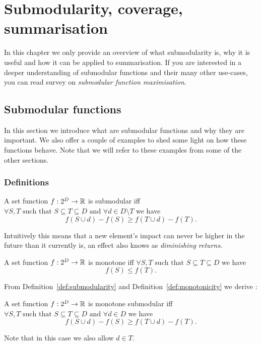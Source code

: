 \chapter{Submodularity, coverage, summarisation}
\label{cap:submodularity}

In this chapter we only provide an overview of what submodularity is, why it is
useful and how it can be applied to summarisation. If you are interested in a
deeper understanding of submodular functions and their many other use-cases,
you can read survey \cite{krause2012submodular} on \emph{submodular function
maximisation}.

\section{Submodular functions}

In this section we introduce what are submodular functions and why they are
important. We also offer a couple of examples to shed some light on how these
functions behave. Note that we will refer to these examples from some of the
other sections.

\subsection{Definitions}

\begin{definition}[Submodularity]
  \label{def:submodularity}
  A set function \(f : 2^D \to \mathbb{R}\) is submodular iff
  \(\forall S, T \text{ such that } S \subseteq T \subseteq D
    \text{ and } \forall d \in D \setminus T\) we have
  \[f(S \cup {d}) - f(S) \geq f(T \cup {d}) - f(T).\]
\end{definition}
Intuitively this means that a new element's impact can never be higher in the
future than it currently is, an effect also knows as \emph{diminishing returns}.

\begin{definition}[Monotonicity]
  \label{def:monotonicity}
  A set function \(f : 2^D \to \mathbb{R}\) is monotone iff
  \(\forall S, T \text{ such that } S \subseteq T \subseteq D\) we have
  \[f(S) \leq f(T).\]
\end{definition}

From Definition~\ref{def:submodularity} and Definition~\ref{def:monotonicity}
we derive \cite{nemhauser1978analysis}:
\begin{proposition}
  \label{def:mono-submod}
  A set function \(f : 2^D \to \mathbb{R}\) is monotone submodular iff
  \(\forall S, T \text{ such that } S \subseteq T \subseteq D
    \text{ and } \forall d \in D\) we have
  \[f(S \cup {d}) - f(S) \geq f(T \cup {d}) - f(T).\]
\end{proposition}
Note that in this case we also allow \(d \in T\).

